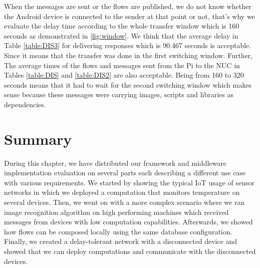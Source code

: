  \noindent When the messages are sent or the flows are published, we do not know whether the Android device is connected to the sender at that point or not, that's why we evaluate the delay time according to the whole transfer window which is 160 seconds as demonstrated in \ref{fig:window}.  We think that the average delay in Table \ref{table:DIS3}  for delivering responses which is  90.467 seconds is acceptable.  Since it means that the transfer was done in the first switching window. Further, The average times  of the flows and messages sent from the Pi to the NUC in Tables  \ref{table:DIS} and \ref{table:DIS2}  are also acceptable. Being from 160 to 320 seconds means that it had to wait for the second switching window which makes sense  because these messages were carrying images, scripts and libraries as dependencies.
\section{Summary}

During this chapter, we have distributed our framework and middleware implementation evaluation on several parts each describing a different use case with various requirements. We started by showing the typical IoT usage of sensor networks in which we deployed a computation that monitors temperature on several devices.  Then, we went on with a more complex scenario where we ran image recognition algorithm on high performing machines which received messages from devices with low computation capabilities. Afterwards, we showed how flows can be composed locally using the same database configuration. Finally, we created a delay-tolerant network with a disconnected device and showed that we can deploy computations and communicate with the disconnected devices.

